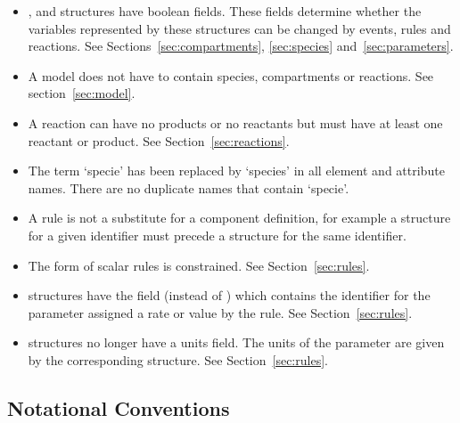 \documentclass[10pt]{cekarticle}
\begin{document}
\begin{itemize}
\item {},  and 
structures have boolean  fields.  These fields
determine whether the variables represented by these structures
can be changed by events, rules and reactions.  See
Sections~\ref{sec:compartments}, \ref{sec:species}
and~\ref{sec:parameters}.

\item A model does not have to contain species, compartments or reactions. See section~\ref{sec:model}.

\item A reaction can have no products or no reactants but must
have at least one reactant or product.  See
Section~\ref{sec:reactions}.

\item The term `specie' has been replaced by `species' in all
element and attribute names.  There are no duplicate names that
contain `specie'.

\item A rule is not a substitute for a component definition, for
example a  structure for a given identifier must
precede a  structure for the same identifier.

\item The form of scalar rules is constrained.  See
Section~\ref{sec:rules}.

\item {} structures have the field
 (instead of ) which contains the
identifier for the parameter assigned a rate or value by the rule.
 See Section~\ref{sec:rules}.

\item {} structures no longer have a units
field.  The units of the parameter are given by the corresponding
 structure.  See Section~\ref{sec:rules}.

\end{itemize}

\subsection{Notational Conventions}
\end{document}
